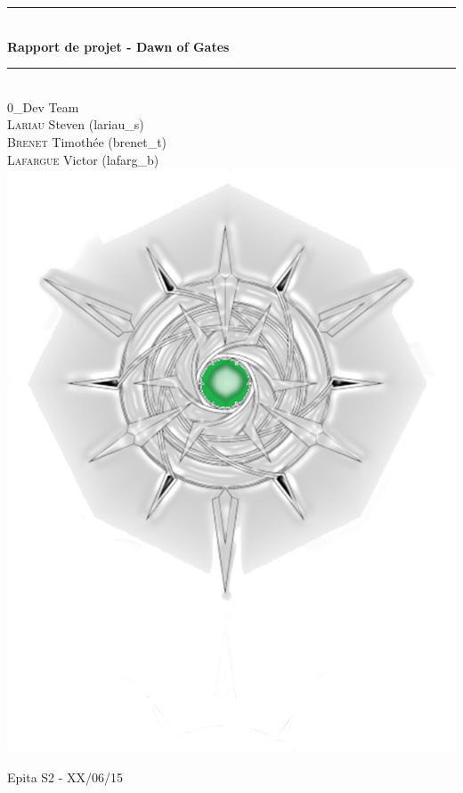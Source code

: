 \documentclass[12pt]{article}
\newcommand{\HRule}{\rule{\linewidth}{0.5mm}}
\begin{document}
\renewcommand{\glossaryname}{Glossaire}

\begin{titlepage}
	\begin{center}

		\HRule \\[0.4cm]
		{ \huge \bfseries Rapport de projet - Dawn of Gates\\[0.4cm] }
		\HRule \\[2cm]


		\large \textsc 0\_Dev Team\\
		\textsc{Lariau} Steven (lariau\_s) \\
		\textsc{Brenet} Timothée (brenet\_t)\\
		\textsc{Lafargue} Victor (lafarg\_b)\\

		\includegraphics[scale=0.45]{logo2.png}
		
		\large \textsc Epita S2 - XX/06/15

	\end{center}
\end{titlepage}
\end{document}

